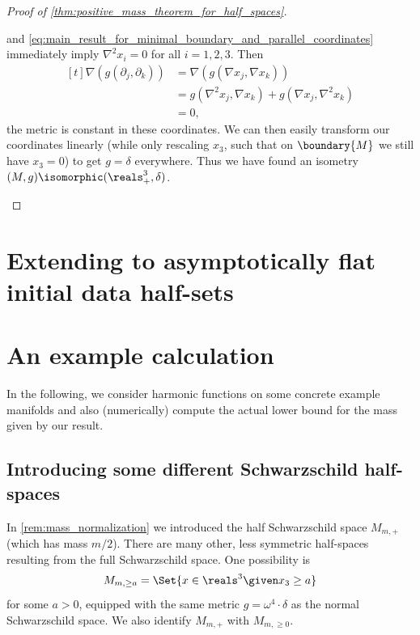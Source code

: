 \documentclass[titlepage,numbers=noenddot,headinclude,oneside,%
footinclude=true,cleardoublepage=empty,%
BCOR=5mm,paper=a4,fontsize=11pt,%
english,%
]{scrartcl}
\begin{document}
\begin{proof}[Proof of \cref{thm:positive_mass_theorem_for_half_spaces}]
\begin{proofdescription}
         and \cref{eq:main_result_for_minimal_boundary_and_parallel_coordinates} immediately imply \( \nabla^2 x_i=0 \) for all \( i=1,2,3 \). Then
        \begin{equation*}
            \begin{aligned}[t]
                \nabla (g(\partial_j,\partial_k))&=\nabla(g(\nabla x_j,\nabla x_k))\\
                &=g(\nabla^2 x_j,\nabla x_k)+g(\nabla x_j,\nabla^2 x_k)\\
                &=0,
            \end{aligned}
        \end{equation*}
        \ie the metric is constant in these coordinates. We can then easily transform our coordinates linearly (while only rescaling \( x_3 \), such that on \( \boundary{M} \) we still have \( x_3=0 \)) to get \( g=\delta \) everywhere. Thus we have found an isometry \( (M,g)\isomorphic (\reals^3_+,\delta) \).
    \end{proofdescription}
\end{proof}
\section{Extending to asymptotically flat initial data half-sets}


\section{An example calculation}\label{sec:example}
In the following, we consider harmonic functions on some concrete example manifolds and also (numerically) compute the actual lower bound for the mass given by our result. 


\subsection{Introducing some different Schwarzschild half-spaces}
In \cref{rem:mass_normalization} we introduced the half Schwarzschild space \( M_{m,+} \) (which has mass \( m/2 \)). There are many other, less symmetric half-spaces resulting from the full Schwarzschild space. One possibility is
\begin{equation*}
    M_{m,\geq a}=\Set{x\in \reals^3\given x_3\geq a}
\end{equation*}
for some \( a>0 \), equipped with the same metric \( g=\omega^4\cdot \delta \) as the normal Schwarzschild space. We also identify \( M_{m,+} \) with \( M_{m,\geq 0} \). 
\end{document}
